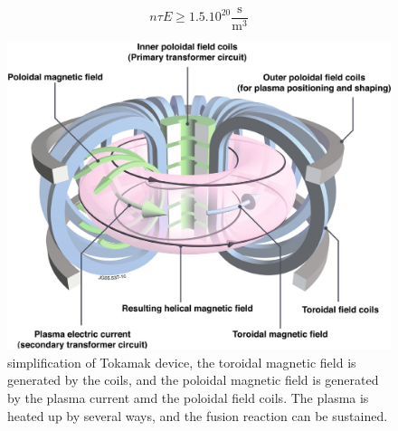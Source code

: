 \documentclass[11pt,a4paper]{report}
\begin{document}
\begin{multicols}{2}
    $$n \tau E \ge 1.5.10^{20}{\frac {\mathrm {s} }{\mathrm {m} ^{3}}}$$
    \begin{figure}[H]
        \centering
        \includegraphics[width=1\linewidth]{./figures/tokamak.png}
        \caption{simplification of Tokamak device, the toroidal magnetic field is generated by the coils, and the poloidal magnetic field is generated by the plasma current amd the poloidal field coils. The plasma is heated up by several ways, and the fusion reaction can be sustained.}
        \label{}
    \end{figure}


\end{multicols}
\end{document}
